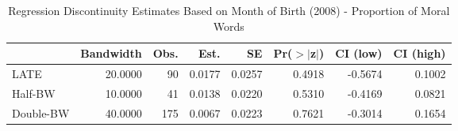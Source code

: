 \begin{table}[ht]
\centering
\begin{tabular}{lrrrrrrr}
  \hline
 & Bandwidth & Obs. & Est. & SE & Pr($>$$|$z$|$) & CI (low) & CI (high) \\ 
  \hline
LATE & 20.0000 & 90 & 0.0177 & 0.0257 & 0.4918 & -0.5674 & 0.1002 \\ 
  Half-BW & 10.0000 & 41 & 0.0138 & 0.0220 & 0.5310 & -0.4169 & 0.0821 \\ 
  Double-BW & 40.0000 & 175 & 0.0067 & 0.0223 & 0.7621 & -0.3014 & 0.1654 \\ 
   \hline
\end{tabular}
\caption{Regression Discontinuity Estimates Based on Month of Birth (2008) - Proportion of Moral Words} 
\label{tab:Xrd2008m2}
\end{table}
